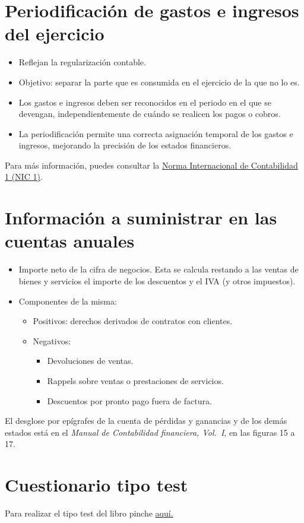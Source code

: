 \documentclass[a4paper,12pt]{article}
\begin{document}
\section{Periodificación de gastos e ingresos del ejercicio}

\begin{itemize}
    \item Reflejan la regularización contable.
    \item Objetivo: separar la parte que es consumida en el ejercicio de la que no lo es.
    \item Los gastos e ingresos deben ser reconocidos en el periodo en el que se devengan, independientemente de cuándo se realicen los pagos o cobros.
    \item La periodificación permite una correcta asignación temporal de los gastos e ingresos, mejorando la precisión de los estados financieros.
\end{itemize}

Para más información, puedes consultar la \href{https://www.ifrs.org/issued-standards/list-of-standards/ias-1-presentation-of-financial-statements/}{Norma Internacional de Contabilidad 1 (NIC 1)}.

\section{Información a suministrar en las cuentas anuales}
\begin{itemize}
    \item Importe neto de la cifra de negocios. Esta se calcula restando a las ventas de bienes y servicios el importe de los descuentos y el IVA (y otros impuestos).
    \item Componentes de la misma:
    \begin{itemize}
        \item Positivos: derechos derivados de contratos con clientes.
        \item Negativos:
        \begin{itemize}
            \item Devoluciones de ventas.
            \item Rappels sobre ventas o prestaciones de servicios.
            \item Descuentos por pronto pago fuera de factura.
        \end{itemize}
    \end{itemize}
\end{itemize}

El desglose por epígrafes de la cuenta de pérdidas y ganancias y de los demás
estados está en el \emph{Manual de Contabilidad financiera, Vol.~I}, en las
figuras 15 a 17.

\section{Cuestionario tipo test}
Para realizar el tipo test del libro pinche \href{https://elblogdeismael.github.io/Subjects/Third/CF1/Tests/testT4libro.html}{aquí.}
\end{document}
